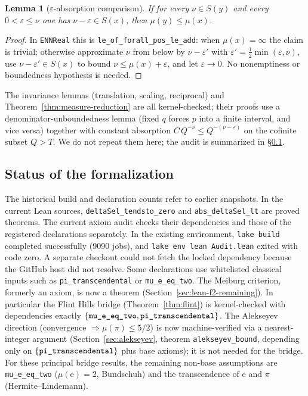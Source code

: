 \documentclass[11pt]{amsart}
\newtheorem{lemma}[theorem]{Lemma}
\theoremstyle{definition}
\theoremstyle{remark}
\numberwithin{equation}{section}
\newcommand{\irr}{\mu}
\newcommand{\ee}{\mathrm{e}}
\begin{document}
\begin{lemma}[$\varepsilon$-absorption comparison]\label{lem:eps-abs}
If for every $\nu\in S(y)$ and every $0<\varepsilon\le\nu$ one has $\nu-\varepsilon\in S(x)$, then $\irr(y)\le\irr(x)$.
\end{lemma}
\begin{proof}
In \texttt{ENNReal} this is \texttt{le\_\allowbreak{}of\_\allowbreak{}forall\_\allowbreak{}pos\_\allowbreak{}le\_\allowbreak{}add}: when $\irr(x)=\infty$ the claim is trivial; otherwise approximate $\nu$ from below by $\nu-\varepsilon'$ with $\varepsilon'=\tfrac12\min(\varepsilon,\nu)$, use $\nu-\varepsilon'\in S(x)$ to bound $\nu\le\irr(x)+\varepsilon$, and let $\varepsilon\to0$. No nonemptiness or boundedness hypothesis is needed.
\end{proof}

The invariance lemmas (translation, scaling, reciprocal) and Theorem~\ref{thm:measure-reduction} are all kernel-checked; their proofs use a denominator-unboundedness lemma (fixed $q$ forces $p$ into a finite interval, and vice versa) together with constant absorption $C\,Q^{-\nu}\le Q^{-(\nu-\varepsilon)}$ on the cofinite subset $Q>T$. We do not repeat them here; the audit is summarized in \S\ref{sec:lean-status}.

\subsection{Status of the formalization}\label{sec:lean-status}

The historical build and declaration counts refer to earlier snapshots.
In the current Lean sources, \texttt{deltaSel\_tendsto\_zero} and
\texttt{abs\_deltaSel\_lt} are proved theorems. The current axiom audit
checks their dependencies and those of the registered declarations
separately. In the existing environment, \texttt{lake build} completed
successfully (9090 jobs), and \texttt{lake env lean Audit.lean} exited
with code zero. A separate checkout could not fetch the locked
dependency because the GitHub host did not resolve. Some declarations use whitelisted classical inputs such
as \texttt{pi\_transcendental} or \texttt{mu\_e\_eq\_two}.
The Meiburg criterion, formerly an axiom, is now a theorem (Section~\ref{sec:lean-f2-remaining}). In particular the Flint Hills bridge (Theorem~\ref{thm:flint}) is kernel-checked with dependencies exactly $\{\texttt{mu\_\allowbreak{}e\_\allowbreak{}eq\_\allowbreak{}two},\texttt{pi\_\allowbreak{}transcendental}\}$. The Alekseyev direction (convergence $\Rightarrow\irr(\pi)\le5/2$) is now machine-verified via a nearest-integer argument (Section~\ref{sec:alekseyev}, theorem \texttt{alekseyev\_\allowbreak{}bound}, depending only on $\{\texttt{pi\_\allowbreak{}transcendental}\}$ plus base axioms); it is not needed for the bridge. For these principal bridge results, the remaining non-base assumptions are \texttt{mu\_\allowbreak{}e\_\allowbreak{}eq\_\allowbreak{}two} ($\irr(\ee)=2$, Bundschuh) and the transcendence of $\ee$ and $\pi$ (Hermite--Lindemann).
\end{document}
